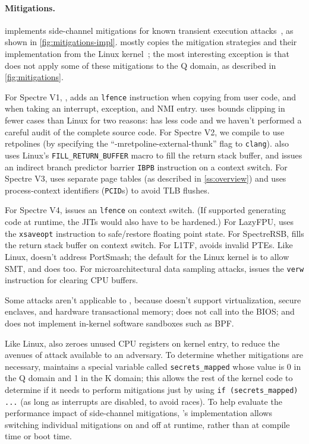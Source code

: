 \paragraph{Mitigations.}

\sys implements side-channel mitigations for known transient
execution attacks~\cite{hill:survey,sok:transient}, as shown
in \autoref{fig:mitigations-impl}.  \sys mostly copies the
mitigation strategies and their implementation from the Linux
kernel~\cite{linux:vuln}; the most interesting exception is that \sys
does not apply some of these mitigations to the Q domain, as described
in \autoref{fig:mitigations}.

For Spectre V1, \sys, adds an \texttt{lfence} instruction when copying
from user code, and when taking an interrupt, exception, and NMI entry.
\sys uses bounds clipping in fewer cases than Linux for two reasons:
\sys has less code and we haven't performed a careful audit of the
complete source code.  For Spectre V2, we compile \sys to use retpolines
(by specifying the ``-mretpoline-external-thunk'' flag to \texttt{clang}). \sys
also uses Linux's \texttt{FILL\_RETURN\_BUFFER} macro to fill the
return stack buffer, and issues an indirect branch predictor barrier
\texttt{IBPB} instruction on a context switch. For Spectre V3, \sys uses
separate page tables (as described in \autoref{ss:overview}) and uses
process-context identifiers (\texttt{PCID}s) to avoid TLB flushes.

For Spectre V4, \sys issues an \texttt{lfence} on context switch. (If
\sys supported generating code at runtime, the JITs would also have to
be hardened.)  For LazyFPU, \sys uses the \texttt{xsaveopt}
instruction to safe/restore floating point state.  For SpectreRSB,
\sys fills the return stack buffer on context switch.  For L1TF, \sys
avoids invalid PTEs. Like Linux, \sys doesn't address PortSmash; the
default for the Linux kernel is to allow SMT, and \sys does too.  For
microarchitectural data sampling attacks, \sys issues the
\texttt{verw} instruction for clearing CPU buffers.

Some attacks aren't applicable to \sys, because \sys doesn't support
virtualization, secure enclaves, and hardware transactional memory;
does not call into the BIOS; and does not implement in-kernel software
sandboxes such as BPF.

Like Linux, \sys also zeroes unused CPU registers on kernel entry, to
reduce the avenues of attack available to an adversary.  To determine
whether mitigations are necessary, \sys maintains a special variable
called \texttt{secrets\_mapped} whose value is 0 in the Q domain and 1 in
the K domain; this allows the rest of the kernel code to determine if it
needs to perform mitigations just by using \texttt{if (secrets\_mapped)
...} (as long as interrupts are disabled, to avoid races).  To help
evaluate the performance impact of side-channel mitigations, \sys's
implementation allows switching individual mitigations on and off at
runtime, rather than at compile time or boot time.

